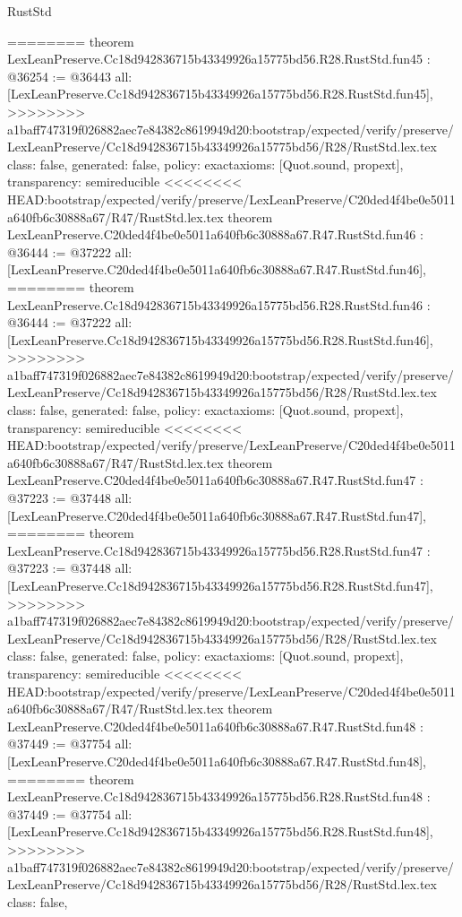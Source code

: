\begin{lexlean}{RustStd}
\begin{coremodule}
{\begin{coremodule}
{{{{{{{{{{{{{{{{{{{{{{{{{{{{{{{{{{{{{{{{{{{{{{{{========
theorem LexLeanPreserve.Cc18d942836715b43349926a15775bd56.R28.RustStd.fun45 : @36254 := @36443 {
  all: [LexLeanPreserve.Cc18d942836715b43349926a15775bd56.R28.RustStd.fun45],
>>>>>>>> a1baff747319f026882aec7e84382c8619949d20:bootstrap/expected/verify/preserve/LexLeanPreserve/Cc18d942836715b43349926a15775bd56/R28/RustStd.lex.tex
  class: false,
  generated: false,
  policy: exact{axioms: [Quot.sound, propext]},
  transparency: semireducible
}
<<<<<<<< HEAD:bootstrap/expected/verify/preserve/LexLeanPreserve/C20ded4f4be0e5011a640fb6c30888a67/R47/RustStd.lex.tex
theorem LexLeanPreserve.C20ded4f4be0e5011a640fb6c30888a67.R47.RustStd.fun46 : @36444 := @37222 {
  all: [LexLeanPreserve.C20ded4f4be0e5011a640fb6c30888a67.R47.RustStd.fun46],
========
theorem LexLeanPreserve.Cc18d942836715b43349926a15775bd56.R28.RustStd.fun46 : @36444 := @37222 {
  all: [LexLeanPreserve.Cc18d942836715b43349926a15775bd56.R28.RustStd.fun46],
>>>>>>>> a1baff747319f026882aec7e84382c8619949d20:bootstrap/expected/verify/preserve/LexLeanPreserve/Cc18d942836715b43349926a15775bd56/R28/RustStd.lex.tex
  class: false,
  generated: false,
  policy: exact{axioms: [Quot.sound, propext]},
  transparency: semireducible
}
<<<<<<<< HEAD:bootstrap/expected/verify/preserve/LexLeanPreserve/C20ded4f4be0e5011a640fb6c30888a67/R47/RustStd.lex.tex
theorem LexLeanPreserve.C20ded4f4be0e5011a640fb6c30888a67.R47.RustStd.fun47 : @37223 := @37448 {
  all: [LexLeanPreserve.C20ded4f4be0e5011a640fb6c30888a67.R47.RustStd.fun47],
========
theorem LexLeanPreserve.Cc18d942836715b43349926a15775bd56.R28.RustStd.fun47 : @37223 := @37448 {
  all: [LexLeanPreserve.Cc18d942836715b43349926a15775bd56.R28.RustStd.fun47],
>>>>>>>> a1baff747319f026882aec7e84382c8619949d20:bootstrap/expected/verify/preserve/LexLeanPreserve/Cc18d942836715b43349926a15775bd56/R28/RustStd.lex.tex
  class: false,
  generated: false,
  policy: exact{axioms: [Quot.sound, propext]},
  transparency: semireducible
}
<<<<<<<< HEAD:bootstrap/expected/verify/preserve/LexLeanPreserve/C20ded4f4be0e5011a640fb6c30888a67/R47/RustStd.lex.tex
theorem LexLeanPreserve.C20ded4f4be0e5011a640fb6c30888a67.R47.RustStd.fun48 : @37449 := @37754 {
  all: [LexLeanPreserve.C20ded4f4be0e5011a640fb6c30888a67.R47.RustStd.fun48],
========
theorem LexLeanPreserve.Cc18d942836715b43349926a15775bd56.R28.RustStd.fun48 : @37449 := @37754 {
  all: [LexLeanPreserve.Cc18d942836715b43349926a15775bd56.R28.RustStd.fun48],
>>>>>>>> a1baff747319f026882aec7e84382c8619949d20:bootstrap/expected/verify/preserve/LexLeanPreserve/Cc18d942836715b43349926a15775bd56/R28/RustStd.lex.tex
  class: false,
}}}}}}}}}}}}}}}}}}}}}}}}}}}}}}}}}}}}}}}}}}}}}}}}}}}}
\end{coremodule}}
\end{coremodule}
\end{lexlean}
